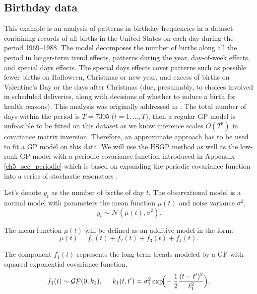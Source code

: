 \documentclass[onecolumn,a4paper,11pt]{article}
\begin{document}
\subsection{Birthday data}\label{ch5_sec_birthday}
This example is an analysis of patterns in birthday frequencies in a dataset containing records of all births in the United States on each day during the period 1969–1988. The model decomposes the number of births along all the period in longer-term trend effects, patterns during the year, day-of-week effects, and special days effects. The special days effects cover patterns such as possible fewer births on Halloween, Christmas or new year, and excess of births on Valentine’s Day or the days after Christmas (due, presumably, to choices involved in scheduled deliveries, along with decisions of whether to induce a birth for health reasons). This analysis was originally addressed in \cite{gelman2013bayesian}. The total number of days within the period is $T=7305$ ($t=1,\dots,T$), then a regular GP model is unfeasible to be fitted on this dataset as we know inference scales $O(T^3)$ in covariance matrix inversion. 
Therefore, an approximate approach has to be used to fit a GP model on this data. We will use the HSGP method as well as the low-rank GP model with a periodic covariance function introduced in Appendix \ref{ch5_sec_periodic} which is based on expanding the periodic covariance function into a series of stochastic resonators \citep{solin2014explicit}.

Let's denote $y_t$ as the number of births of day $t$. The observational model is a normal model with parameters the mean function $\mu(t)$ and noise variance $\sigma^2$,
%
\begin{equation*}
y_{t} \sim \mathcal{N}(\mu(t),\sigma^2).
\end{equation*}

\noindent The mean function $\mu(t)$ will be defined as an additive model in the form: 
%
\begin{equation} \label{ch5_eq_mean_brithday}
\mu(t) = f_1(t) + f_2(t) + f_3(t) + f_4(t).
\end{equation}

The component $f_1(t)$ represents the long-term trends modeled by a GP with squared exponential covariance function,
%
\begin{equation*}
f_1(t) \sim \mathcal{GP}(0,k_1), \hspace{5mm} k_1(t,t') = \sigma_1^2 \exp\!\!\Big(\!-\frac{1}{2} \frac{(t-t')^2}{\ell_1^2}\Big), 
\end{equation*}
\end{document}
